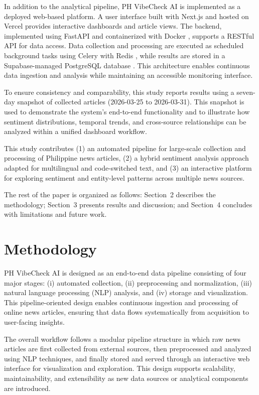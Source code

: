 \documentclass[sigconf, nonacm]{acmart}
\begin{document}
In addition to the analytical pipeline, PH VibeCheck AI is implemented as a deployed web-based platform. A user interface built with Next.js \cite{nextjs} and hosted on Vercel \cite{vercel} provides interactive dashboards and article views. The backend, implemented using FastAPI \cite{fastapi} and containerized with Docker \cite{docker}, supports a RESTful API for data access. Data collection and processing are executed as scheduled background tasks using Celery \cite{celery} with Redis \cite{redis}, while results are stored in a Supabase-managed PostgreSQL database \cite{supabase,postgresql}. This architecture enables continuous data ingestion and analysis while maintaining an accessible monitoring interface.

To ensure consistency and comparability, this study reports results using a seven-day snapshot of collected articles (2026-03-25 to 2026-03-31). This snapshot is used to demonstrate the system’s end-to-end functionality and to illustrate how sentiment distributions, temporal trends, and cross-source relationships can be analyzed within a unified dashboard workflow.

This study contributes (1) an automated pipeline for large-scale collection and processing of Philippine news articles, (2) a hybrid sentiment analysis approach adapted for multilingual and code-switched text, and (3) an interactive platform for exploring sentiment and entity-level patterns across multiple news sources.

The rest of the paper is organized as follows: Section~2 describes the methodology; Section~3 presents results and discussion; and Section~4 concludes with limitations and future work.

\section{Methodology}
PH VibeCheck AI is designed as an end-to-end data pipeline consisting of four major stages: (i) automated collection, (ii) preprocessing and normalization, (iii) natural language processing (NLP) analysis, and (iv) storage and visualization. This pipeline-oriented design enables continuous ingestion and processing of online news articles, ensuring that data flows systematically from acquisition to user-facing insights.

The overall workflow follows a modular pipeline structure in which raw news articles are first collected from external sources, then preprocessed and analyzed using NLP techniques, and finally stored and served through an interactive web interface for visualization and exploration. This design supports scalability, maintainability, and extensibility as new data sources or analytical components are introduced.
\end{document}
